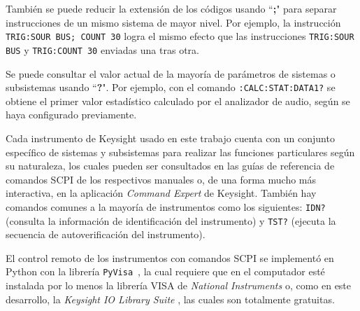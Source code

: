 También se puede reducir la extensión de los códigos usando ``\textbf{;}" para separar instrucciones de un mismo sistema de mayor nivel.
Por ejemplo, la instrucción \texttt{\small TRIG:SOUR BUS; COUNT 30} logra el mismo efecto que las instrucciones \texttt{\small TRIG:SOUR BUS} y \texttt{\small TRIG:COUNT 30} enviadas una tras otra.

Se puede consultar el valor actual de la mayoría de parámetros de sistemas o subsistemas usando ``\textbf{?}". Por ejemplo, con el comando \texttt{\small :CALC:STAT:DATA1?} se obtiene el primer valor estadístico calculado por el analizador de audio, según se haya configurado previamente.

Cada instrumento de Keysight usado en este trabajo cuenta con un conjunto específico de sistemas y subsistemas para realizar las funciones particulares según su naturaleza, los cuales pueden ser consultados en las guías de referencia de comandos SCPI de los respectivos manuales o, de una forma mucho más interactiva, en la aplicación \emph{Command Expert} de Keysight.
También hay comandos comunes a la mayoría de instrumentos como los siguientes: \texttt{\small *IDN?} (consulta la información de identificación del instrumento) y \texttt{\small *TST?} (ejecuta la secuencia de autoverificación del instrumento).

El control remoto de los instrumentos con comandos SCPI se implementó en Python con la librería \texttt{\small PyVisa}~\citeyearpar{PyVisa2022}, la cual requiere que en el computador esté instalada por lo menos la librería VISA de \emph{National Instruments} o, como en este desarrollo, la \emph{Keysight IO Library Suite} , las cuales son totalmente gratuitas.
